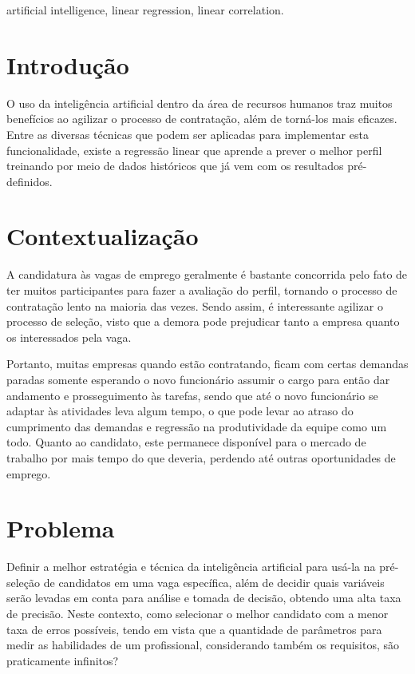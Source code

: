 \documentclass[conference]{IEEEtran}
\begin{document}
\begin{IEEEkeywords}
artificial intelligence, linear regression, linear correlation.
\end{IEEEkeywords}

\section{Introdução}
O uso da inteligência artificial dentro da área de recursos humanos traz muitos benefícios ao agilizar o processo de contratação, além de torná-los mais eficazes. Entre as diversas técnicas que podem ser aplicadas para implementar esta funcionalidade, existe a regressão linear que aprende a prever o melhor perfil treinando por meio de dados históricos que já vem com os resultados pré-definidos.

\section{Contextualização}

A candidatura às vagas de emprego geralmente é bastante concorrida pelo fato de ter muitos participantes para fazer a avaliação do perfil, tornando o processo de contratação lento na maioria das vezes. Sendo assim, é interessante agilizar o processo de seleção, visto que a demora pode prejudicar tanto a empresa quanto os interessados pela vaga. 

Portanto, muitas empresas quando estão contratando, ficam com certas demandas paradas somente esperando o novo funcionário assumir o cargo para então dar andamento e prosseguimento às tarefas, sendo que até o novo funcionário se adaptar às atividades leva algum tempo, o que pode levar ao atraso do cumprimento das demandas e regressão na produtividade da equipe como um todo. Quanto ao candidato, este permanece disponível para o mercado de trabalho por mais tempo do que deveria, perdendo até outras oportunidades de emprego. 

\section{Problema}
Definir a melhor estratégia e técnica da inteligência artificial para usá-la na pré-seleção de candidatos em uma vaga específica, além de decidir quais variáveis serão levadas em conta para análise e tomada de decisão, obtendo uma alta taxa de precisão. Neste contexto, como selecionar o melhor candidato com a menor taxa de erros possíveis, tendo em vista que a quantidade de parâmetros para medir as habilidades de um profissional, considerando também os requisitos, são praticamente infinitos?
\end{document}
